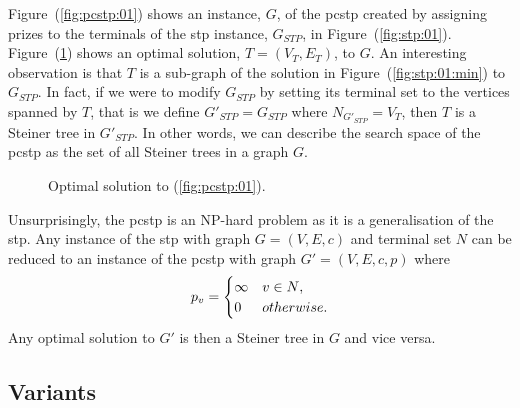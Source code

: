 Figure~(\ref{fig:pcstp:01}) shows an instance, $G$, of the \gls{pcstp} created by assigning prizes to the terminals of the \gls{stp} instance, $G_{STP}$, in Figure~(\ref{fig:stp:01}).
Figure~(\ref{fig:pcstp:01:opt})
shows an optimal solution, $T = (V_T, E_T)$, to $G$. An interesting observation is that
$T$ is a sub-graph of the solution in Figure~(\ref{fig:stp:01:min}) to $G_{STP}$.
In fact, if we were to modify $G_{STP}$ by setting its terminal set to the vertices spanned
by $T$, that is we define $G'_{STP} =  G_{STP}$ where  $N_{G'_{STP}} = V_T$, then $T$ is a Steiner
tree in $G'_{STP}$. In other words, we can describe the search space of the \gls{pcstp}
 as the set of all Steiner trees in a graph $G$.

\begin{figure}[h]\centering
{}
\caption{Optimal solution to (\ref{fig:pcstp:01})\textnormal{.}}
\label{fig:pcstp:01:opt}
\end{figure}

Unsurprisingly, the \gls{pcstp} is an NP-hard problem as it is a generalisation of the \gls{stp}. Any instance of
the \gls{stp} with graph $G = (V, E, c)$ and terminal set $N$ can be reduced to an instance of the \gls{pcstp}
with graph $G' = (V, E, c, p)$ where
$$p_v =
\begin{cases}
  \infty & v \in N\mathnormal{,} \\
  0 & \mathnormal{otherwise.}
\end{cases}$$
Any optimal solution to $G'$ is then a Steiner tree in $G$ and vice versa.

\subsection{Variants}

